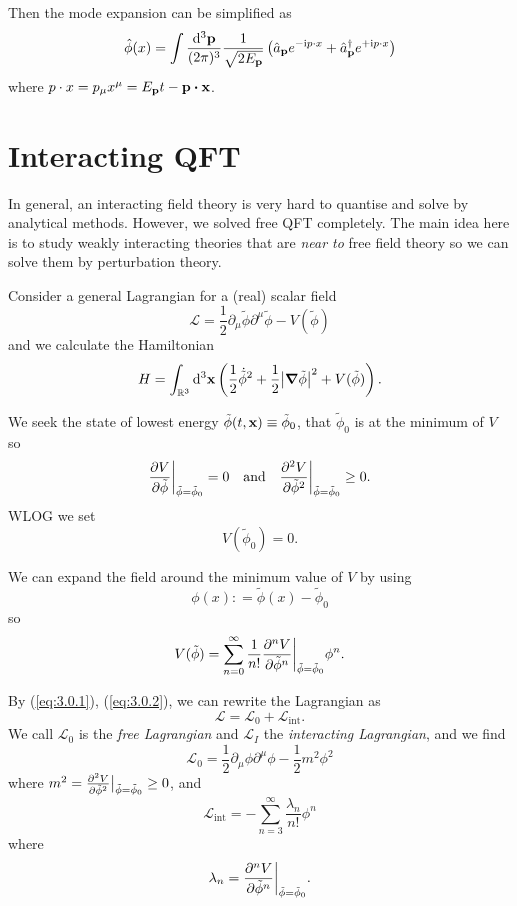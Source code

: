 \documentclass[a4paper,11pt]{article}
\begin{document}
	Then the mode expansion can be simplified as 
	\[
		\hat \phi(x) = \int \frac{\dd[3]{\vb p}}{(2\pi)^{3}} \frac{1}{\sqrt{2 E _{\vb p}}} \left( \hat a _{\vb p} e ^{- \mathrm{i} p \cdot x} + \hat a ^{\dagger}_{\vb p} e ^{+ \mathrm{i} p \cdot x} \right)
	\]
	where $p \cdot x = p_\mu x^\mu = E _{\vb p}t - \vb p \vdot \vb x$. 
	\newpage
	\section{Interacting QFT}

	In general, an interacting field theory is very hard to quantise and solve by analytical methods. However, we solved free QFT completely. The main idea here is to study weakly interacting theories that are \emph{near to} free field theory so we can solve them by perturbation theory.

	Consider a general Lagrangian for a (real) scalar field
	\[
		\mathcal{L} = \frac{1}{2} \partial_\mu \tilde{\phi} \partial^\mu \tilde \phi - V (\tilde \phi)
	\]
	and we calculate the Hamiltonian
	\[
		H = \int _{\mathbb{R}^3} \dd[3]{\vb x} \left( \frac{1}{2} \dot{\tilde{\phi}}^2 + \frac{1}{2} \abs{\grad \tilde{\phi}}^2 + V(\tilde \phi) \right).
	\]
	
	We seek the state of lowest energy $\tilde \phi(t, \vb x) \equiv \tilde \phi_0$, that $\tilde \phi_0$ is at the minimum of $V$ so
	\begin{equation}
		\pdv{V}{\tilde \phi}\bigg|_{\tilde \phi = \tilde \phi_0} = 0 \quad \text{and} \quad \pdv[2]{V}{\tilde \phi}\bigg|_{\tilde \phi = \tilde \phi_0} \geq 0.
		\label{eq:3.0.1}
	\end{equation}
	WLOG we set \begin{equation}
		V(\tilde \phi_0) = 0.
		\label{eq:3.0.2}
	\end{equation}
	
	We can expand the field around the minimum value of $V$ by using
	\[
		\phi(x) : = \tilde \phi(x) - \tilde \phi_0
	\]
	so
	\[
		V(\tilde \phi) = \sum _{n = 0}^{\infty} \frac{1}{n!} \pdv[n]{V}{\tilde \phi}\bigg|_{\tilde \phi = \tilde \phi_0} \phi^n.
	\]
	
	By (\ref{eq:3.0.1}), (\ref{eq:3.0.2}), we can rewrite the Lagrangian as
	\[
		\mathcal{L} = \mathcal{L}_0 + \mathcal{L}_{\text{int}}.
	\]
	We call $\mathcal{L}_0$ is the \emph{free Lagrangian} and $\mathcal{L}_I$ the \emph{interacting Lagrangian}, and we find
	\[
		\mathcal{L}_0 = \frac{1}{2} \partial_\mu \phi \partial^\mu \phi - \frac{1}{2} m^2 \phi^2
	\]
	where $m^2 = \pdv[2]{V}{\tilde \phi}\big|_{\tilde \phi = \tilde{\phi}_0} \geq 0$, and
	\[
		\mathcal{L}_{\text{int}} = - \sum _{n = 3}^{\infty} \frac{\lambda_n}{n!} \phi^n
	\]
	where
	\[
		\lambda_n = \pdv[n]{V}{\tilde \phi}\bigg|_{\tilde \phi = \tilde{\phi}_0}.
	\]
\end{document}

